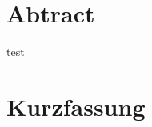 \section*{Abtract}
test
\pagebreak
\thispagestyle{empty}
\mbox{}
\newpage
\section*{Kurzfassung}
\pagebreak
